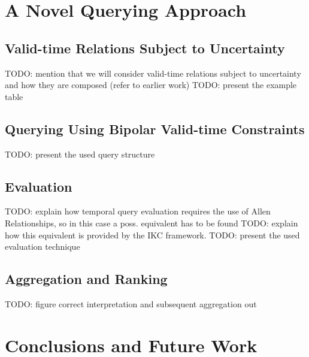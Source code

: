 \documentclass[runningheads,a4paper]{llncs}
\begin{document}
\section{A Novel Querying Approach\label{sec:proposal}}

\subsection{Valid-time Relations Subject to Uncertainty}
TODO: mention that we will consider valid-time relations subject to uncertainty and how they are composed (refer to earlier work)
TODO: present the example table

\subsection{Querying Using Bipolar Valid-time Constraints}
TODO: present the used query structure

\subsection{Evaluation}
TODO: explain how temporal query evaluation requires the use of Allen Relationships, so in this case a poss. equivalent has to be found
TODO: explain how this equivalent is provided by the IKC framework.
TODO: present the used evaluation technique

\subsection{Aggregation and Ranking}
TODO: figure correct interpretation and subsequent aggregation out


\section{Conclusions and Future Work\label{sec:conclusions}}




\end{document}
